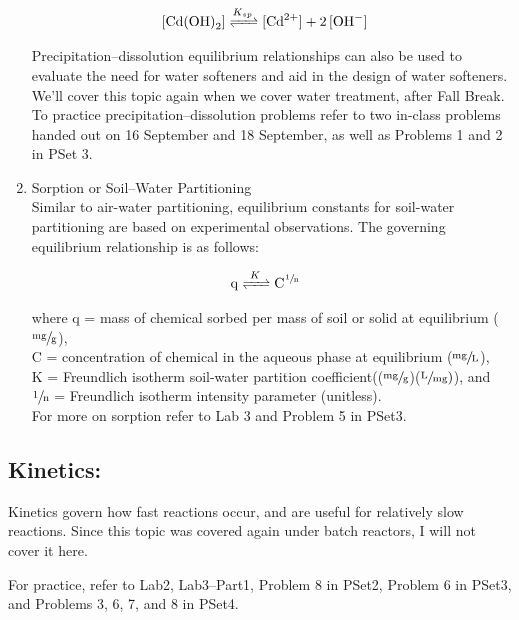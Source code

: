 \documentclass[12pt,letterpaper]{article}
\begin{document}
\begin{enumerate}
\begin{align*}
\cee{[Cd(OH)_2]  &<=>[K_{sp}] [Cd^{2+}] + 2[OH^-]}
\end{align*}

Precipitation--dissolution equilibrium relationships can also be used to evaluate the need for water softeners and aid in the design of water softeners.  We'll cover this topic again when we cover water treatment, after Fall Break.\\

To practice precipitation--dissolution problems refer to two in-class problems handed out on 16 September and 18 September, as well as Problems 1 and 2 in PSet 3.

\item Sorption or Soil--Water Partitioning\\

Similar to air-water partitioning, equilibrium constants for soil-water partitioning are based on experimental observations. The governing equilibrium relationship is as follows:

\begin{align*}
\cee{q  &<=>[K]C^{\sfrac{1}{n}}}
\end{align*}

where q = mass of chemical sorbed per mass of soil or solid at equilibrium ($\mathrm{\sfrac{mg}{g}}$),\\

C = concentration of chemical in the aqueous phase at equilibrium ($\mathrm{\sfrac{mg}{L}}$),\\

K = Freundlich isotherm soil-water partition coefficient(($\mathrm{\sfrac{mg}{g}}$)($\mathrm{\sfrac{L}{mg})}$), and\\

$\mathrm{\sfrac{1}{n}}$ = Freundlich isotherm intensity parameter (unitless).\\


For more on sorption refer to Lab 3 and Problem 5 in PSet3.

\end{enumerate}

\subsection {Kinetics:}

Kinetics govern how fast reactions occur, and are useful for relatively slow reactions.  Since this topic was covered again under batch reactors, I will not cover it here.

For practice, refer to Lab2, Lab3--Part1, Problem 8 in PSet2, Problem 6 in PSet3, and Problems 3, 6, 7, and 8 in PSet4.
\end{document}
